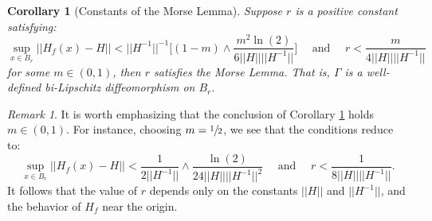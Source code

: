 \documentclass[11pt]{article}
\newcommand{\1}{\mathbf{1}}
\newtheorem{corr}{Corollary}%
\theoremstyle{definition}
\theoremstyle{remark}
\newtheorem*{remark}{Remark}
\begin{document}
\begin{mdframed}
    \begin{corr}[Constants of the Morse Lemma]\label{corr:morse_constants}
        Suppose $r$ is a positive constant satisfying:
        \begin{equation}\nonumber
            \sup_{x\in B_r}||H_f(x)-H|| < ||H^{-1}||^{-1}\bigg[(1-m) \land  \frac{m^2\ln(2)}{6||H||||H^{-1}||}\bigg] \quad \text{ and }\quad r < \frac{m}{4||H||||H^{-1}||}
        \end{equation}
        for some $m\in (0,1)$, then $r$ satisfies the Morse Lemma. That is, $\Gamma$ is a well-defined bi-Lipschitz diffeomorphism on $B_{r}$.
    \end{corr}
    \vspace*{0.2cm}
\end{mdframed}
\begin{remark}
    It is worth emphasizing that the conclusion of Corollary \ref{corr:morse_constants} holds  $m\in (0,1)$. For instance, choosing $m=\sfrac{1}{2}$, we see that the conditions reduce to:
        \begin{equation}\nonumber
            \sup_{x\in B_r}||H_f(x)-H|| < \frac{1}{2||H^{-1}||} \land  \frac{\ln(2)}{24||H||||H^{-1}||^2} \quad \text{ and }\quad r < \frac{1}{8||H||||H^{-1}||}.
        \end{equation}
    It follows that the value of $r$ depends only on the constants $||H||$ and $||H^{-1}||$, and the behavior of $H_f$ near the origin.
\end{remark}
\end{document}
